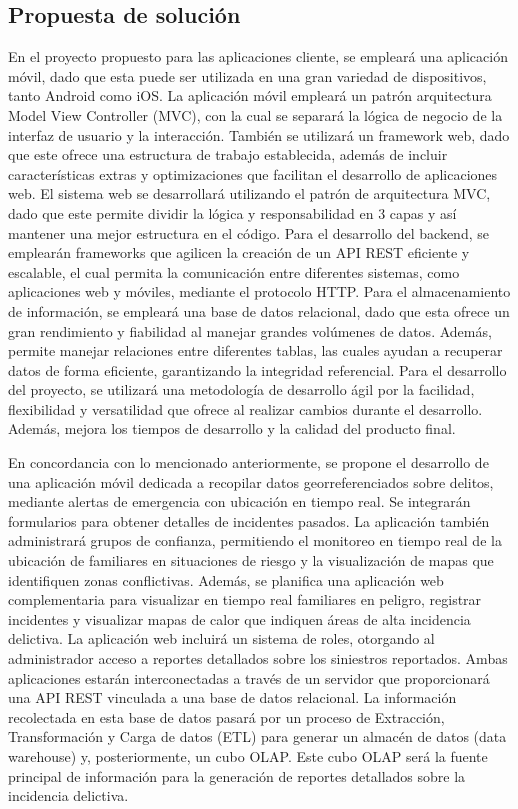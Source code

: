 \subsection{Propuesta de solución}



En el proyecto propuesto para las aplicaciones cliente, se empleará una aplicación móvil, dado que esta puede ser utilizada en una gran variedad de
dispositivos, tanto Android como iOS. La aplicación móvil empleará un patrón arquitectura Model View Controller (MVC), con la cual se separará la lógica de
negocio de la interfaz de usuario y la interacción. También se utilizará un framework web, dado que este ofrece una estructura de trabajo establecida,
además de incluir características extras y optimizaciones que facilitan el desarrollo de aplicaciones web. El sistema web se desarrollará utilizando el
patrón de arquitectura MVC, dado que este permite dividir la lógica y responsabilidad en 3 capas y así mantener una mejor estructura en el código.
Para el desarrollo del backend, se emplearán frameworks que agilicen la creación de un API REST eficiente y escalable, el cual permita la comunicación
entre diferentes sistemas, como aplicaciones web y móviles, mediante el protocolo HTTP. Para el almacenamiento de información, se empleará una base de
datos relacional, dado que esta ofrece un gran rendimiento y fiabilidad al manejar grandes volúmenes de datos. Además, permite manejar relaciones entre
diferentes tablas, las cuales ayudan a recuperar datos de forma eficiente, garantizando la integridad referencial. Para el desarrollo del proyecto, se
utilizará una metodología de desarrollo ágil por la facilidad, flexibilidad y versatilidad que ofrece al realizar cambios durante el desarrollo. Además,
mejora los tiempos de desarrollo y la calidad del producto final.

\bigbreak
En concordancia con lo mencionado anteriormente, se propone el desarrollo de una aplicación móvil dedicada
a recopilar datos georreferenciados sobre delitos, mediante alertas de emergencia con ubicación en tiempo
real. Se integrarán formularios para obtener detalles de incidentes pasados. La aplicación también administrará
grupos de confianza, permitiendo el monitoreo en tiempo real de la ubicación de familiares en situaciones de
riesgo y la visualización de mapas que identifiquen zonas conflictivas. Además, se planifica una aplicación
web complementaria para visualizar en tiempo real familiares en peligro, registrar incidentes y visualizar
mapas de calor que indiquen áreas de alta incidencia delictiva. La aplicación web incluirá un sistema de roles,
otorgando al administrador acceso a reportes detallados sobre los siniestros reportados. Ambas aplicaciones
estarán interconectadas a través de un servidor que proporcionará una API REST vinculada a una base de datos
relacional. La información recolectada en esta base de datos pasará por un proceso de Extracción, Transformación
y Carga de datos (ETL) para generar un almacén de datos (data warehouse) y, posteriormente, un cubo OLAP.
Este cubo OLAP será la fuente principal de información para la generación de reportes detallados sobre la
incidencia delictiva.

